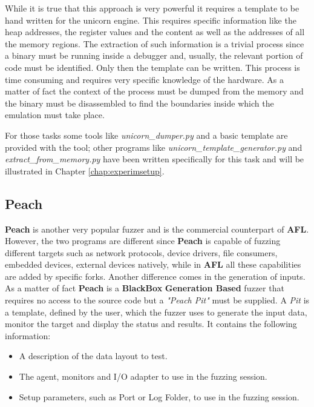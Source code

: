 \documentclass[../main.tex]{subfiles}
\begin{document}
While it is true that this approach is very powerful it requires a template  to be hand written for the unicorn engine. This requires specific information like the heap addresses, the register values and the content as well as the addresses of all the memory regions. The extraction of such information is a trivial process since a binary must be running inside a debugger and, usually, the relevant portion of code must be identified. Only then the template can be written. This process is time consuming and requires very specific knowledge of the hardware. As a matter of fact the context of the process must be dumped from the memory and the binary must be disassembled to find the boundaries inside which the emulation must take place.

For those tasks some tools like \textit{unicorn\_dumper.py} and a basic template are provided with the tool; other programs like \textit{unicorn\_template\_generator.py} and \textit{extract\_from\_memory.py} have been  written specifically for this task and will be illustrated in Chapter \ref{chap:experimsetup}.

\subsection{Peach}

\textbf{Peach} is another very popular fuzzer and is the commercial counterpart of \textbf{AFL}. However, the two programs are different since \textbf{Peach} is capable of fuzzing different targets such as network protocols, device drivers, file consumers, embedded devices, external devices natively, while in \textbf{AFL} all these capabilities are added by specific forks. Another difference comes in the generation of inputs. As a matter of fact \textbf{Peach} is a \textbf{BlackBox} \textbf{Generation Based} fuzzer that requires no access to the source code but a \textit{"Peach Pit"} must be supplied. A \textit{Pit} is a template, defined by the user, which the fuzzer uses to generate the input data, monitor the target and display the status and results. It contains the following information:

\begin{itemize}
  \item A description of the data layout to test.
  \item The agent, monitors and I/O adapter to use in the fuzzing session.
  \item Setup parameters, such as Port or Log Folder, to use in the fuzzing session.
\end{itemize}
\end{document}
